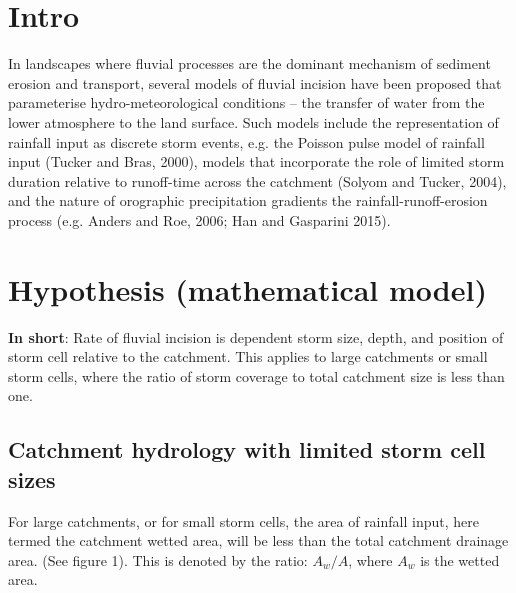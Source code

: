 \documentclass[12pt,oneside,PhD]{muthesis}
\begin{document}
\section{Intro}
In landscapes where fluvial processes are the dominant mechanism of sediment erosion and transport, several models of fluvial incision have been proposed that parameterise hydro-meteorological conditions -- the transfer of water from the lower atmosphere to the land surface. Such models include the representation of rainfall input as discrete storm events, e.g. the Poisson pulse model of rainfall input (Tucker and Bras, 2000), models that incorporate the role of limited storm duration relative to runoff-time across the catchment (Solyom and Tucker, 2004), and the nature of orographic precipitation gradients the rainfall-runoff-erosion process (e.g. Anders and Roe, 2006; Han and Gasparini 2015). 


\section{Hypothesis (mathematical model)}

\textbf{In short}: Rate of fluvial incision is dependent storm size, depth, and position of storm cell relative to the catchment. This applies to large catchments or small storm cells, where the ratio of storm coverage to total catchment size is less than one. 

\subsection{Catchment hydrology with limited storm cell sizes}
For large catchments, or for small storm cells, the area of rainfall input, here termed the catchment wetted area, will be less than the total catchment drainage area. (See figure 1). This is denoted by the ratio: \(A_w/A\), where \(A_w\) is the wetted area. 

\end{document}
